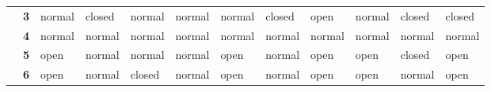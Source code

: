 \documentclass[12pt]{article}
\begin{document}
\begin{table}[]
{\begin{tabular}{clllllllllll}
			\multicolumn{1}{c|}{}                                   & \multicolumn{1}{l|}{\textbf{3}}  & \multicolumn{1}{l|}{\cellcolor[HTML]{FFFC9E}normal} & \multicolumn{1}{l|}{\cellcolor[HTML]{FD6864}closed} & \multicolumn{1}{l|}{\cellcolor[HTML]{FFFC9E}normal} & \multicolumn{1}{l|}{\cellcolor[HTML]{FFFC9E}normal} & \multicolumn{1}{l|}{\cellcolor[HTML]{FFFC9E}normal} & \multicolumn{1}{l|}{\cellcolor[HTML]{FD6864}closed} & \multicolumn{1}{l|}{\cellcolor[HTML]{32CB00}open}   & \multicolumn{1}{l|}{\cellcolor[HTML]{FFFC9E}normal} & \multicolumn{1}{l|}{\cellcolor[HTML]{FD6864}closed} & \multicolumn{1}{l|}{\cellcolor[HTML]{FD6864}closed} \\ \cline{2-12}
			\multicolumn{1}{c|}{}                                   & \multicolumn{1}{l|}{\textbf{4}}  & \multicolumn{1}{l|}{\cellcolor[HTML]{FFFC9E}normal} & \multicolumn{1}{l|}{\cellcolor[HTML]{FFFC9E}normal} & \multicolumn{1}{l|}{\cellcolor[HTML]{FFFC9E}normal} & \multicolumn{1}{l|}{\cellcolor[HTML]{FFFC9E}normal} & \multicolumn{1}{l|}{\cellcolor[HTML]{FFFC9E}normal} & \multicolumn{1}{l|}{\cellcolor[HTML]{FFFC9E}normal} & \multicolumn{1}{l|}{\cellcolor[HTML]{FFFC9E}normal} & \multicolumn{1}{l|}{\cellcolor[HTML]{FFFC9E}normal} & \multicolumn{1}{l|}{\cellcolor[HTML]{FFFC9E}normal} & \multicolumn{1}{l|}{\cellcolor[HTML]{FFFC9E}normal} \\ \cline{2-12}
			\multicolumn{1}{c|}{}                                   & \multicolumn{1}{l|}{\textbf{5}}  & \multicolumn{1}{l|}{\cellcolor[HTML]{32CB00}open}   & \multicolumn{1}{l|}{\cellcolor[HTML]{FFFC9E}normal} & \multicolumn{1}{l|}{\cellcolor[HTML]{FFFC9E}normal} & \multicolumn{1}{l|}{\cellcolor[HTML]{FFFC9E}normal} & \multicolumn{1}{l|}{\cellcolor[HTML]{32CB00}open}   & \multicolumn{1}{l|}{\cellcolor[HTML]{FFFC9E}normal} & \multicolumn{1}{l|}{\cellcolor[HTML]{32CB00}open}   & \multicolumn{1}{l|}{\cellcolor[HTML]{32CB00}open}   & \multicolumn{1}{l|}{\cellcolor[HTML]{FD6864}closed} & \multicolumn{1}{l|}{\cellcolor[HTML]{32CB00}open}   \\ \cline{2-12}
			\multicolumn{1}{c|}{}                                   & \multicolumn{1}{l|}{\textbf{6}}  & \multicolumn{1}{l|}{\cellcolor[HTML]{32CB00}open}   & \multicolumn{1}{l|}{\cellcolor[HTML]{FFFC9E}normal} & \multicolumn{1}{l|}{\cellcolor[HTML]{FD6864}closed} & \multicolumn{1}{l|}{\cellcolor[HTML]{FFFC9E}normal} & \multicolumn{1}{l|}{\cellcolor[HTML]{32CB00}open}   & \multicolumn{1}{l|}{\cellcolor[HTML]{FFFC9E}normal} & \multicolumn{1}{l|}{\cellcolor[HTML]{32CB00}open}   & \multicolumn{1}{l|}{\cellcolor[HTML]{32CB00}open}   & \multicolumn{1}{l|}{\cellcolor[HTML]{FFFC9E}normal} & \multicolumn{1}{l|}{\cellcolor[HTML]{32CB00}open}   \\ \cline{2-12}

\end{tabular}}
\end{table}
\end{document}
